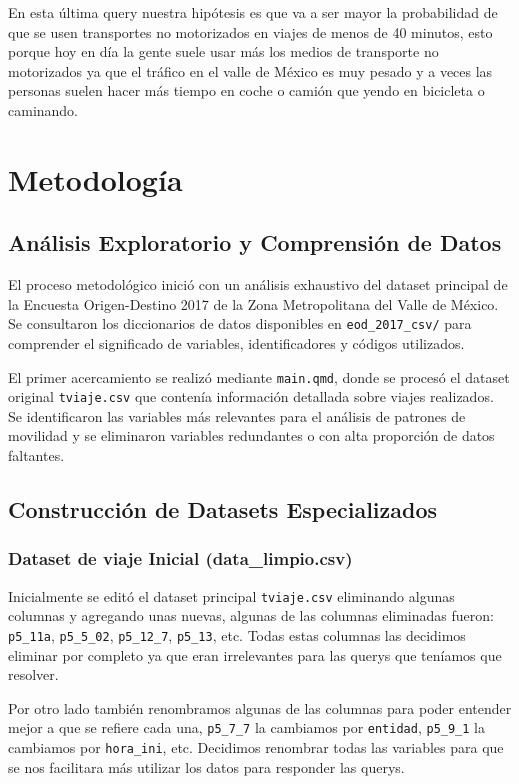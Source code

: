 \documentclass[12pt,a4paper]{article}
\begin{document}
En esta última query nuestra hipótesis es que va a ser mayor la probabilidad de que se usen transportes no motorizados en viajes de menos de 40 minutos, esto porque hoy en día la gente suele usar más los medios de transporte no motorizados ya que el tráfico en el valle de México es muy pesado y a veces las personas suelen hacer más tiempo en coche o camión que yendo en bicicleta o caminando.

\section{Metodología}

\subsection{Análisis Exploratorio y Comprensión de Datos}

El proceso metodológico inició con un análisis exhaustivo del dataset principal de la Encuesta Origen-Destino 2017 de la Zona Metropolitana del Valle de México. Se consultaron los diccionarios de datos disponibles en \texttt{eod\_2017\_csv/} para comprender el significado de variables, identificadores y códigos utilizados.

El primer acercamiento se realizó mediante \texttt{main.qmd}, donde se procesó el dataset original \texttt{tviaje.csv} que contenía información detallada sobre viajes realizados. Se identificaron las variables más relevantes para el análisis de patrones de movilidad y se eliminaron variables redundantes o con alta proporción de datos faltantes.

\subsection{Construcción de Datasets Especializados}

\subsubsection{Dataset de viaje Inicial (data\_limpio.csv)}

Inicialmente se editó el dataset principal \texttt{tviaje.csv} eliminando algunas columnas y agregando unas nuevas, algunas de las columnas eliminadas fueron: \texttt{p5\_11a}, \texttt{p5\_5\_02}, \texttt{p5\_12\_7}, \texttt{p5\_13}, etc. Todas estas columnas las decidimos eliminar por completo ya que eran irrelevantes para las querys que teníamos que resolver. 

Por otro lado también renombramos algunas de las columnas para poder entender mejor a que se refiere cada una, \texttt{p5\_7\_7} la cambiamos por \texttt{entidad}, \texttt{p5\_9\_1} la cambiamos por \texttt{hora\_ini}, etc. Decidimos renombrar todas las variables para que se nos facilitara más utilizar los datos para responder las querys.
\end{document}
